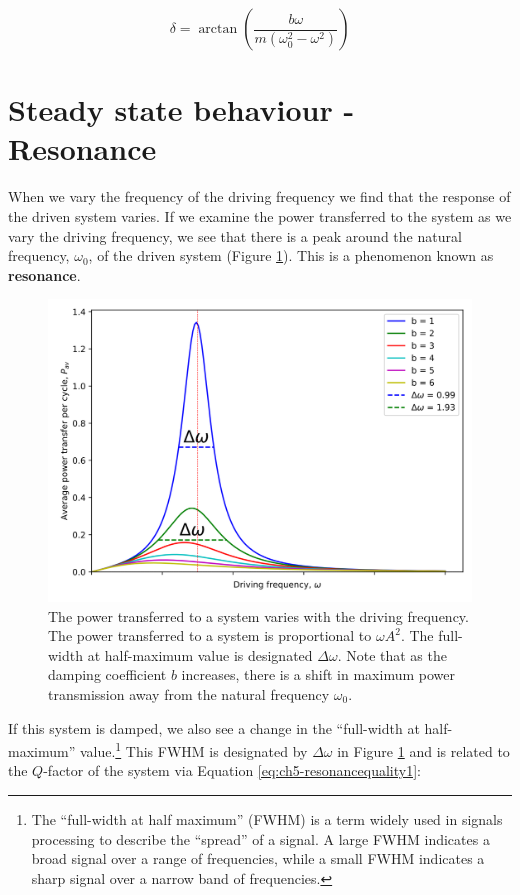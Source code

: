 \documentclass[
]{book}
\begin{document}
\begin{equation}
\delta = \arctan \left( \frac{b\omega}{m \left(  \omega_0^2 - \omega^2 \right)} \right)
\label{eq:ch5-forcedshm5}
\end{equation}

\hypertarget{sec:ch5-steadystatebehaviour}{%
\section{Steady state behaviour - Resonance}\label{sec:ch5-steadystatebehaviour}}

When we vary the frequency of the driving frequency we find that the response of the driven system varies. If we examine the power transferred to the system as we vary the driving frequency, we see that there is a peak around the natural frequency, \(\omega_0\), of the driven system (Figure \ref{fig:ch5-resonancepowerfrequency1}). This is a phenomenon known as \textbf{resonance}.

\begin{figure}

{\centering \includegraphics[width=0.7\linewidth]{visualisations/ch5-forcedosc2} 

}

\caption{The power transferred to a system varies with the driving frequency. The power transferred to a system is proportional to $\omega A^2$. The full-width at half-maximum value is designated $\Delta \omega$. Note that as the damping coefficient $b$ increases, there is a shift in maximum power transmission away from the natural frequency $\omega_0$.}\label{fig:ch5-resonancepowerfrequency1}
\end{figure}

If this system is damped, we also see a change in the ``full-width at half-maximum'' value.\footnote{The ``full-width at half maximum'' (FWHM) is a term widely used in signals processing to describe the ``spread'' of a signal. A large FWHM indicates a broad signal over a range of frequencies, while a small FWHM indicates a sharp signal over a narrow band of frequencies.} This FWHM is designated by \(\Delta \omega\) in Figure \ref{fig:ch5-resonancepowerfrequency1} and is related to the \(Q\)-factor of the system via Equation \eqref{eq:ch5-resonancequality1}:
\end{document}
